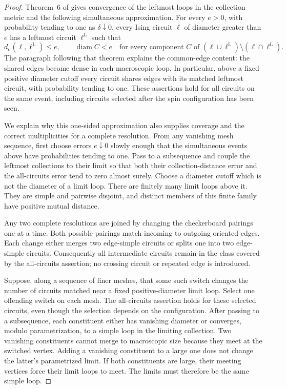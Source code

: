 \begin{proof}
Theorem~6 of \cite{BH2019} gives convergence of the leftmost loops in
the collection metric and the following simultaneous approximation.
For every $e>0$, with probability tending to one as $\delta\downarrow0$,
every Ising circuit $\ell$ of diameter greater than $e$ has a leftmost
circuit $\ell^{\mathrm L}$ such that
\[
 d_{\mathrm u}(\ell,\ell^{\mathrm L})\le e,
 \qquad
 \operatorname{diam} C<e
 \quad\text{for every component }C\text{ of }
 (\ell\cup\ell^{\mathrm L})\setminus(\ell\cap\ell^{\mathrm L}).
\]
The paragraph following that theorem explains the common-edge content:
the shared edges become dense in each macroscopic loop. In particular,
above a fixed positive diameter cutoff every circuit shares edges with
its matched leftmost circuit, with probability tending to one. These
assertions hold for all circuits on the same event, including circuits
selected after the spin configuration has been seen.

We explain why this one-sided approximation also supplies coverage and
the correct multiplicities for a complete resolution. From any vanishing
mesh sequence, first choose errors $e\downarrow0$ slowly enough that the
simultaneous events above have probabilities tending to one. Pass to a
subsequence and couple the leftmost collections to their limit so that
both their collection-distance error and the all-circuits error tend to
zero almost surely. Choose a diameter
cutoff which is not the diameter of a limit loop.  There are finitely
many limit loops above it.  They are simple and pairwise disjoint, and
distinct members of this finite family have positive mutual distance.

Any two complete resolutions are joined by changing the checkerboard
pairings one at a time.  Both possible pairings match incoming to
outgoing oriented edges.  Each change either merges two edge-simple
circuits or splits one into two edge-simple circuits.  Consequently all
intermediate circuits remain in the class covered by the all-circuits
assertion; no crossing circuit or repeated edge is introduced.

Suppose, along a sequence of finer meshes, that some such switch changes
the number of circuits matched near a fixed positive-diameter limit
loop.  Select one offending switch on each mesh.  The all-circuits
assertion holds for these selected circuits, even though the selection
depends on the configuration.  After passing to a subsequence, each
constituent either has vanishing diameter or converges, modulo
parametrization, to a simple loop in the limiting collection.  Two
vanishing constituents cannot merge to macroscopic size because they
meet at the switched vertex.  Adding a vanishing constituent to a large
one does not change the latter's parametrized limit.  If both
constituents are large, their meeting vertices force their limit loops
to meet.  The limits must therefore be the same simple loop.


\end{proof}
